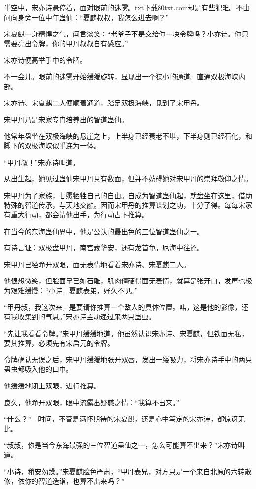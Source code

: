 \begin{this_body}
半空中，宋亦诗悬停着，面对眼前的迷雾。txt下载80txt.com却是有些犯难。不由问向身旁一位中年蛊仙：“夏麒叔叔，我怎么进去啊？”

宋夏麒一身精悍之气，闻言淡笑：“老爷子不是交给你一块令牌吗？小亦诗。你只需要亮出令牌，你的甲丹叔叔自有感应。”

宋亦诗便高举手中的令牌。

不一会儿。眼前的迷雾开始缓缓旋转，显现出一个狭小的通道。直通双极海峡内部。

宋亦诗、宋夏麒二人便顺着通道，踏足双极海峡，见到了宋甲丹。

宋甲丹乃是宋家专门培养出的智道蛊仙。

他常年盘坐在双极海峡的悬崖之上，上半身已经衰老不堪，下半身则已经石化，和脚下的双极海峡似乎连为一体。

“甲丹叔！”宋亦诗叫道。

从出生起，她见过蛊仙宋甲丹只有数面，但并不妨碍她对宋甲丹的崇拜敬仰之情。

宋甲丹为了家族，甘愿牺牲自己的自由。自成为智道蛊仙起，就盘坐在这里，借助特殊的智道传承，与天地交融。因而宋甲丹的推算谋划之功，十分了得。每每宋家有重大行动，都会请他出手，为行动占卜推算。

在当今的东海蛊仙界中，他是公认的最出色的三位智道蛊仙之一。

有诗言证：双极盘甲丹，南宫藏华安，还有龙首龟，厄海中往还。

宋甲丹已经睁开双眼，面无表情地看着宋亦诗、宋夏麒二人。

他很想微笑，但脸面早已如石雕，肌肉僵硬得面无表情，就算是张开口，发声也极为艰难缓慢：“小诗，夏麒表弟，好久不见。”

“甲丹叔，我这次来，是要请你推算一个敌人的具体位置。喏，这是他的影像，还有我收集到的气息。”宋亦诗主动递过来两只蛊虫。

“先让我看看令牌。”宋甲丹缓缓地道。他虽然认识宋亦诗、宋夏麒，但铁面无私，要其推算，必须先有宋启元的令牌。

令牌确认无误之后，宋甲丹缓缓地张开双唇，发出一缕吸力，将宋亦诗手中的两只蛊虫都吸入他的口中。

他缓缓地闭上双眼，进行推算。

良久，他睁开双眼，眼中流露出疑惑之情：“我算不出来。”

“什么？”一时间，不管是满怀期待的宋夏麒，还是心中笃定的宋亦诗，都惊讶无比。

“叔叔，你是当今东海最强的三位智道蛊仙之一，怎么可能算不出来？”宋亦诗叫道。

“小诗，稍安勿躁。”宋夏麒脸色严肃，“甲丹表兄，对方只是一个来自北原的六转散修，依你的智道造诣，也算不出来吗？”


\end{this_body}
